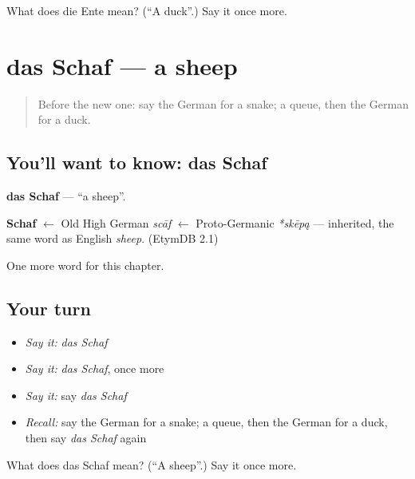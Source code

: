 \begin{tcolorbox}[breakable,colback=teal!4,colframe=teal!35!black,title={Before you move on}]
What does die Ente mean? (\textquotedblleft{}A duck\textquotedblright{}.) Say it once more.
\end{tcolorbox}
\section[das Schaf]{das Schaf — a sheep}

\label{lesson:GE-C87-schaf}



\begin{quote}
Before the new one: say the German for a snake; a queue, then the German for a duck.
\end{quote}

\subsection*{You'll want to know: das Schaf}
\textbf{das Schaf} — \textquotedblleft{}a sheep\textquotedblright{}.

\begin{cousinweb}
\textbf{Schaf} $\leftarrow$ Old High German \emph{scāf} $\leftarrow$ Proto-Germanic \emph{*skēpą} — inherited, the same word as English \emph{sheep}. (EtymDB 2.1)
\end{cousinweb}

\begin{grammarlens}[title={What you've built}]
One more word for this chapter.
\end{grammarlens}

\subsection*{Your turn}
\begin{itemize}
\raggedright
  \item \emph{Say it:} \emph{das Schaf}
  \item \emph{Say it:} \emph{das Schaf}, once more
  \item \emph{Say it:} say \emph{das Schaf}
  \item \emph{Recall:} say the German for a snake; a queue, then the German for a duck, then say \emph{das Schaf} again
\end{itemize}

\begin{tcolorbox}[breakable,colback=teal!4,colframe=teal!35!black,title={Before you move on}]
What does das Schaf mean? (\textquotedblleft{}A sheep\textquotedblright{}.) Say it once more.
\end{tcolorbox}
